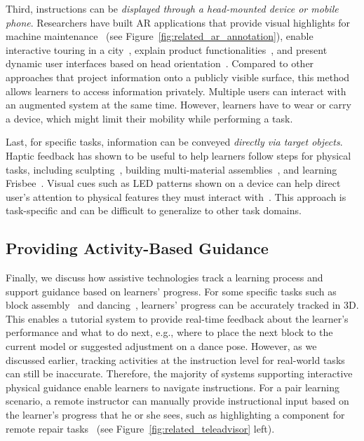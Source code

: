 Third, instructions can be \emph{displayed through a head-mounted device or mobile phone}. Researchers have built AR applications that provide visual highlights for machine maintenance~\cite{Henderson:2011ff,Mohr:2015:RTD:2702123.2702490} (see Figure~\ref{fig:related_ar_annotation}), enable interactive touring in a city~\cite{Feiner1997}, explain product functionalities~\cite{MagicLens}, and present dynamic user interfaces based on head orientation~\cite{Zhang:2014:HHO:2659766.2659773}.
%
Compared to other approaches that project information onto a publicly visible surface, this method allows learners to access information privately. Multiple users can interact with an augmented system at the same time. However, learners have to wear or carry a device, which might limit their mobility while performing a task.

Last, for specific tasks, information can be conveyed \emph{directly via target objects}. Haptic feedback has shown to be useful to help learners follow steps for physical tasks, including sculpting~\cite{Zoran:2013:FFD:2470654.2481361,Agrawal:2015:PPS:2807442.2807505}, building multi-material assemblies~\cite{Schoop:2016:DSS:2851581.2892429}, and learning Frisbee~\cite{Solomon:2014:UTI:2540930.2540965}. Visual cues such as LED patterns shown on a device can help direct user's attention to physical features they must interact with~\cite{Solomon:2014:UTI:2540930.2540965,Vasey:2016:HHR:2897839.2927404}.
%
This approach is task-specific and can be difficult to generalize to other task domains.

\subsection{Providing Activity-Based Guidance}
Finally, we discuss how assistive technologies track a learning process and support guidance based on learners' progress. For some specific tasks such as block assembly~\cite{Gupta2012DuploTrack,Wu:2016:ARI:2856400.2856416} and dancing~\cite{Anderson:2013:YEM:2501988.2502045}, learners' progress can be accurately tracked in 3D. This enables a tutorial system to provide real-time feedback about the learner's performance and what to do next, e.g., where to place the next block to the current model or suggested adjustment on a dance pose.
%
However, as we discussed earlier, tracking activities at the instruction level for real-world tasks can still be inaccurate. Therefore, the majority of systems supporting interactive physical guidance enable learners to navigate instructions.
%
For a pair learning scenario, a remote instructor can manually provide instructional input based on the learner's progress that he or she sees, such as highlighting a component for remote repair tasks~\cite{Gurevich:2012ko,Kirk:2006:CRG:1124772.1124951} (see Figure~\ref{fig:related_teleadvisor} left).

